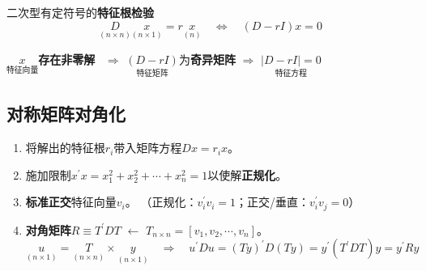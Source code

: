 \documentclass[12pt, a4paper, oneside]{article}
\begin{document}
\begin{CJK*}{UTF8}{gbsn}
\noindent
二次型有定符号的\textbf{特征根检验}
$$
\underset{(n \times n)}{D} \underset{(n \times 1)}{x}=r \underset{(n)}{x}
\quad \Longleftrightarrow \quad
(D-r I) x=0
$$

$\underset{\textbf{特征向量}}{x}$\textbf{存在非零解}
\ $\Rightarrow$
$\underset{\textbf{特征矩阵}}{(D-rI)}$为\textbf{奇异矩阵}
$\Rightarrow$
$\underset{\textbf{特征方程}}{|D-rI|=0}$

%
\subsection{对称矩阵对角化}
\begin{enumerate}
	\item 将解出的特征根$r_i$带入矩阵方程$Dx=r_i x$。
	\item 施加限制$x^\prime x = x_1^2+x_2^2+\cdots+x_n^2=1$以使解\textbf{正规化}。
	\item \textbf{标准正交}特征向量$v_i$。
		（正规化：$v_{i}^{\prime} v_{i}=1$；正交/垂直：$v_{i}^{\prime} v_{j}=0$）
	\item \textbf{对角矩阵}$R \equiv T^{\prime} D T$ $\leftarrow$
	$T_{n \times n}=[v_{1}, v_{2}, \cdots, v_{n}]$。
	\\
	$
	\underset{(n \times 1)}{u}=\underset{(n \times n)}{T}\times \underset{(n \times 1)}{y}
	\quad \Rightarrow \quad
	u^{\prime} D u 
	= (T y)^{\prime} D (T y)
	= y^{\prime} (T^{\prime} D T) y
	= y^{\prime}Ry
	$
\end{enumerate}

%

\end{CJK*}
\end{document}
